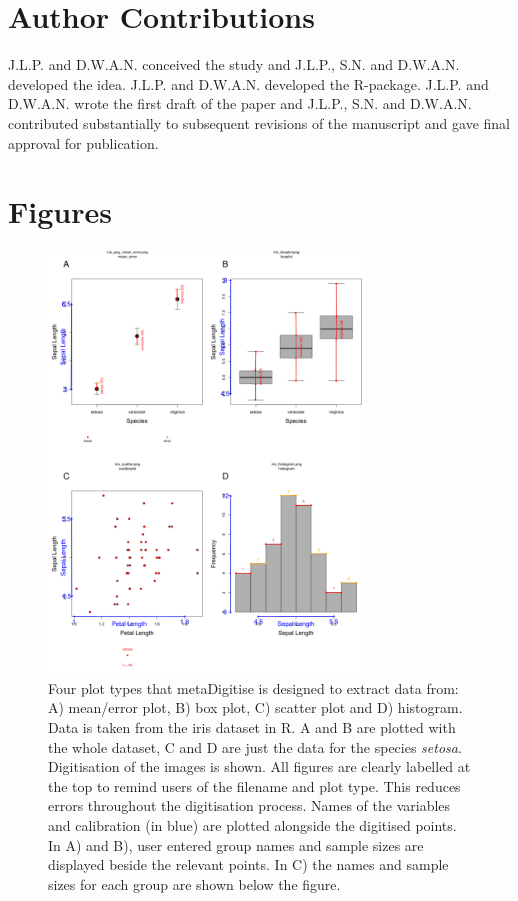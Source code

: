 \documentclass[12pt]{article}
\newcommand{\pkg}[1]{{\fontseries{b}\selectfont #1}}
\begin{document}
\section*{Author Contributions}
J.L.P. and D.W.A.N. conceived the study and J.L.P., S.N. and D.W.A.N. developed the idea. J.L.P. and D.W.A.N. developed the R-package. J.L.P. and D.W.A.N. wrote the first draft of the paper and J.L.P., S.N. and D.W.A.N. contributed substantially to subsequent revisions of the manuscript and gave final approval for publication.






\section*{Figures}

\begin{figure}[!h]
\centering 
 \includegraphics[width=0.75\textwidth]{fig_all_extract.pdf} 
 \caption{Four plot types that \pkg{metaDigitise} is designed to extract data from: A) mean/error plot, B) box plot, C) scatter plot and D) histogram. Data is taken from the iris dataset in R. A and B are plotted with the whole dataset, C and D are just the data for the species \textit{setosa}. Digitisation of the images is shown. All figures are clearly labelled at the top to remind users of the filename and plot type. This reduces errors throughout the digitisation process. Names of the variables and calibration (in blue) are plotted alongside the digitised points. In A) and B), user entered group names and sample sizes are displayed beside the relevant points. In C) the names and sample sizes for each group are shown below the figure.}
\label{fig:all_extract}
\end{figure}
\end{document}
